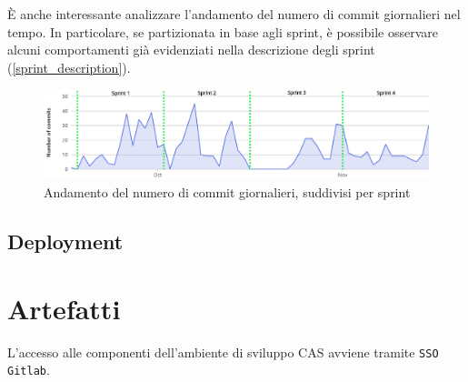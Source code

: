 \documentclass[11pt]{article}
\newcommand{\fref}[1]{\hyperref[#1]{\cref{#1}}}
\begin{document}
È anche interessante analizzare l'andamento del numero di commit giornalieri nel tempo.
In particolare, se partizionata in base agli sprint, è possibile osservare alcuni comportamenti già evidenziati nella descrizione degli sprint (\fref{sprint_description}).
\begin{figure}[H]
    \centering
    \includegraphics[width=15cm]{./img/git/commit.png}
    \caption{Andamento del numero di commit giornalieri, suddivisi per sprint}
\end{figure}


\newpage
\subsection{Deployment}



\newpage
\section{Artefatti}
L'accesso alle componenti dell'ambiente di sviluppo CAS avviene tramite \texttt{SSO Gitlab}.
\nocite{*}


\end{document}
